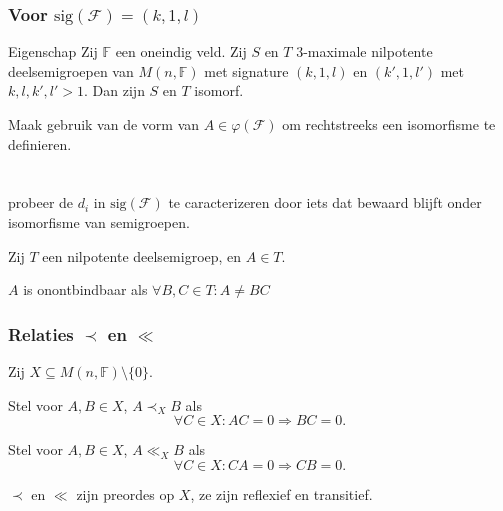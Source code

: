 \documentclass[12pt]{beamer}
\newcommand{\F}{\mathbb{F}}
\newcommand{\sig}{\mathrm{sig}}
\begin{document}
\begin{frame}
\frametitle{Voor $\sig(\mathcal{F}) = (k,1,l)$}

\begin{block}{Eigenschap}
Zij $\F$ een oneindig veld. Zij $S$ en $T$ $3$-maximale nilpotente deelsemigroepen van $M(n,\F)$ met signature $(k,1,l)$ en $(k',1,l')$ met $k,l,k',l' > 1$. Dan zijn $S$ en $T$ isomorf.
\end{block}

\begin{block}{}
Maak gebruik van de vorm van $A \in \varphi(\mathcal{F})$ om rechtstreeks een isomorfisme te definieren.
\end{block}

\end{frame}

\begin{frame}
\frametitle{ $ $ }

\begin{block}{}
probeer de $d_i$ in $\sig(\mathcal{F})$ te caracterizeren door iets dat bewaard blijft onder isomorfisme van semigroepen. 
\end{block}

\begin{block}{}
Zij $T$ een nilpotente deelsemigroep, en $A \in T$.

$A$ is onontbindbaar als $\forall B,C \in T: A \neq BC$
\end{block}

\end{frame}


\begin{frame}
\frametitle{Relaties $\prec$ en $\ll$}

\begin{block}{}
Zij $X \subseteq M(n,\F)\setminus \{0\} $. 

Stel voor $A,B \in X$, $A\prec_X B$ als 
$$\forall C \in X : AC = 0 \Rightarrow BC = 0.$$

Stel voor $A,B \in X$, $A \ll_X B $ als 
$$\forall C \in X : CA = 0 \Rightarrow CB = 0.$$

\end{block}

\begin{block}{}
$\prec$ en $\ll$ zijn preordes op $X$, ze zijn reflexief en transitief.
\end{block}


\end{frame}
\end{document}
